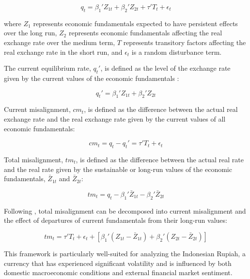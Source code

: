 \documentclass[11pt,a4paper]{article}
\begin{document}
\begin{equation}
q_t = \beta_1'Z_{1t} + \beta_2'Z_{2t} + \tau'T_t + \epsilon_t
\label{eq:beer_general}
\end{equation}

where $Z_1$ represents economic fundamentals expected to have persistent effects over the long run, $Z_2$ represents economic fundamentals affecting the real exchange rate over the medium term, $T$ represents transitory factors affecting the real exchange rate in the short run, and $\epsilon_t$ is a random disturbance term.

The current equilibrium rate, $q_t'$, is defined as the level of the exchange rate given by the current values of the economic fundamentals \citep{ClarkMacDonald1998}:

\begin{equation}
q_t' = \beta_1'Z_{1t} + \beta_2'Z_{2t}
\label{eq:current_equilibrium}
\end{equation}

Current misalignment, $cm_t$, is defined as the difference between the actual real exchange rate and the real exchange rate given by the current values of all economic fundamentals:

\begin{equation}
cm_t = q_t - q_t' = \tau'T_t + \epsilon_t
\label{eq:current_misalignment}
\end{equation}

Total misalignment, $tm_t$, is defined as the difference between the actual real rate and the real rate given by the sustainable or long-run values of the economic fundamentals, $\bar{Z}_{1t}$ and $\bar{Z}_{2t}$:

\begin{equation}
tm_t = q_t - \beta_1'\bar{Z}_{1t} - \beta_2'\bar{Z}_{2t}
\label{eq:total_misalignment}
\end{equation}

Following \cite{ClarkMacDonald1998}, total misalignment can be decomposed into current misalignment and the effect of departures of current fundamentals from their long-run values:

\begin{equation}
tm_t = \tau'T_t + \epsilon_t + [\beta_1'(Z_{1t} - \bar{Z}_{1t}) + \beta_2'(Z_{2t} - \bar{Z}_{2t})]
\label{eq:misalignment_decomposition}
\end{equation}

This framework is particularly well-suited for analyzing the Indonesian Rupiah, a currency that has experienced significant volatility and is influenced by both domestic macroeconomic conditions and external financial market sentiment.
\end{document}
